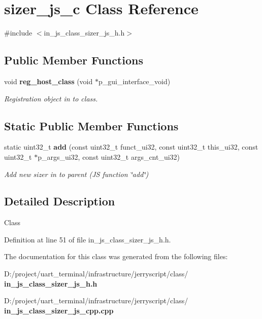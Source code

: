 \section{sizer\+\_\+js\+\_\+c Class Reference}
\label{classsizer__js__c}


{\ttfamily \#include $<$in\+\_\+js\+\_\+class\+\_\+sizer\+\_\+js\+\_\+h.\+h$>$}

\subsection*{Public Member Functions}
\begin{DoxyCompactItemize}
\item 
void \textbf{ reg\+\_\+host\+\_\+class} (void $\ast$p\+\_\+gui\+\_\+interface\+\_\+void)
\begin{DoxyCompactList}\small\item\em Registration object in to class. \end{DoxyCompactList}\end{DoxyCompactItemize}
\subsection*{Static Public Member Functions}
\begin{DoxyCompactItemize}
\item 
static uint32\+\_\+t \textbf{ add} (const uint32\+\_\+t funct\+\_\+ui32, const uint32\+\_\+t this\+\_\+ui32, const uint32\+\_\+t $\ast$p\+\_\+args\+\_\+ui32, const uint32\+\_\+t args\+\_\+cnt\+\_\+ui32)
\begin{DoxyCompactList}\small\item\em Add new sizer in to parent (JS function \char`\"{}add\char`\"{}) \end{DoxyCompactList}\end{DoxyCompactItemize}


\subsection{Detailed Description}
Class 

Definition at line 51 of file in\+\_\+js\+\_\+class\+\_\+sizer\+\_\+js\+\_\+h.\+h.



The documentation for this class was generated from the following files\+:\begin{DoxyCompactItemize}
\item 
D\+:/project/uart\+\_\+terminal/infrastructure/jerryscript/class/\textbf{ in\+\_\+js\+\_\+class\+\_\+sizer\+\_\+js\+\_\+h.\+h}\item 
D\+:/project/uart\+\_\+terminal/infrastructure/jerryscript/class/\textbf{ in\+\_\+js\+\_\+class\+\_\+sizer\+\_\+js\+\_\+cpp.\+cpp}\end{DoxyCompactItemize}
